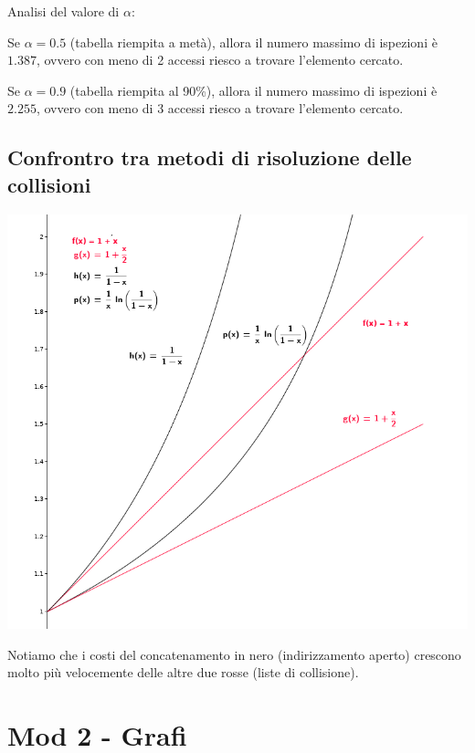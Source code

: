 \documentclass{article}
\begin{document}
{{Analisi del valore di $\alpha$:}

{Se $\alpha=0.5$ (tabella riempita a metà), allora il numero massimo di ispezioni è $1.387$, ovvero con meno di 2 accessi riesco a trovare l'elemento cercato.}

{Se $\alpha=0.9$ (tabella riempita al 90\%), allora il numero massimo di ispezioni è $2.255$, ovvero con meno di 3 accessi riesco a trovare l'elemento cercato.}

\hypertarget{h.sg1b57l388xe}{\subsection{\texorpdfstring{{Confrontro tra
metodi di risoluzione delle
collisioni}}{Confrontro tra metodi di risoluzione delle collisioni}}\label{h.sg1b57l388xe}}

{\includegraphics{images/image541.png}}

{}

{Notiamo che i costi del concatenamento in nero (indirizzamento aperto)
crescono molto più velocemente delle altre due rosse (liste di
collisione).}

\hypertarget{h.fi9e3nt34nfb}{\section{\texorpdfstring{{Mod 2 -
}{Grafi}}{Mod 2 - Grafi}}\label{h.fi9e3nt34nfb}}

}
\end{document}
